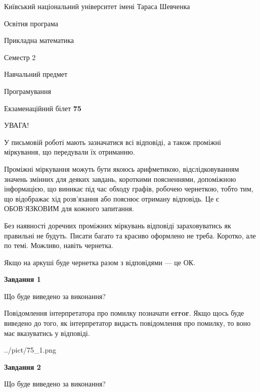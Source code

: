 \documentclass[12pt, ukrainian]{article}
\begin{document}
{{\begin {small}\par
{ \center  Київський національний університет імені Тараса Шевченка \par}
{\parbox {5 cm}{Освітня програма \hfill}{\parbox {7 cm}{Прикладна математика \hfill}}\parbox {6 cm}{\hfill Семестр 2}}\par
{\parbox {5 cm} {Навчальний предмет \hfill}\parbox {7 cm}{Програмування \hfill}\parbox {6cm}{\hfill}\par}\vspace{-7pt} \end{small}}{\center Екзаменаційний білет \No \textbf
{ 75 }\par}}
{
\begin {large}
УВАГА!

У письмовій роботі мають зазначатися всі відповіді, а також проміжні міркування, що передували їх отриманню.

Проміжні міркування можуть бути якоюсь арифметикою, відслідковуванням зна\-чень змінних для деяких завдань,
короткими поясненнями, допоміжною інформацією, що виникає під час обходу графів, робочею чернеткою,
тобто тим, що відображає хід розв’язання або пояснює отриману відповідь.
Це є ОБОВ’ЯЗКОВИМ для кожного запитання.

Без наявності доречних проміжних міркувань відповіді зараховуватись як правиль\-ні не будуть.
Писати багато та красиво оформлено не треба. Коротко, але по темі. Можли\-во, навіть чернетка.

Якщо на аркуші буде чернетка разом з відповідями --- це ОК.

\newpage

{\begin {center}\textbf{Завдання 1}\end {center}}\par
Що буде виведено за виконання?

Повідомлення інтерпретатора про помилку позначати \textbf{error}.
Якщо щось буде виведено до того, як інтерпретатор видасть повідомлення про помилку, 
то воно має вказуватись у відповіді. \par


\begin{center}
	{../pict/75_1.png}
\end{center}
\newpage

{\begin {center}\textbf{Завдання 2}\end {center}}\par
Що буде виведено за виконання?


\end{large}}
\end{document}
